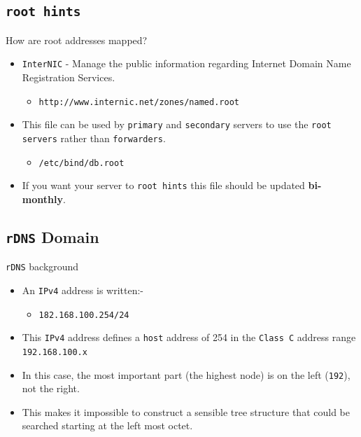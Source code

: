 \documentclass[xcolor=table,aspectratio=169]{beamer}
\begin{document}
\subsection{\texttt{root hints}}
\begin{frame}{How are root addresses mapped?}
  \begin{itemize}
    \item \texttt{InterNIC} - Manage the public information regarding Internet Domain Name Registration Services. 
      \begin{itemize}
        \item \texttt{http://www.internic.net/zones/named.root} 
      \end{itemize}
    \item This file can be used by \texttt{primary} and \texttt{secondary} servers to use the \texttt{root servers} rather than \texttt{forwarders}.
      \begin{itemize}
        \item \texttt{/etc/bind/db.root} 
      \end{itemize}
    \item If you want your server to \texttt{root hints} this file should be updated \textbf{bi-monthly}.
  \end{itemize}
\end{frame}

\subsection{\texttt{rDNS} Domain}
\begin{frame}{\texttt{rDNS} background}
  \begin{itemize}
    \item An \texttt{IPv4} address is written:-
      \begin{itemize}
        \item \texttt{182.168.100.254/24} 
      \end{itemize}
    \item This \texttt{IPv4} address defines a \texttt{host} address of 254 in the \texttt{Class C} address range \texttt{192.168.100.x}
    \item In this case, the most important part (the highest node) is on the left (\texttt{192}), not the right. 
    \item This makes it impossible to construct a sensible tree structure that could be searched starting at the left most octet.
  \end{itemize}
\end{frame}
\end{document}

